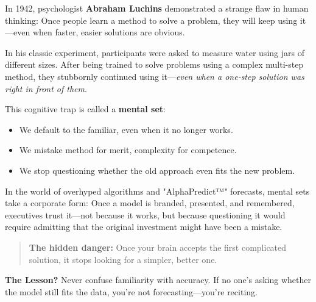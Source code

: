 \begin{tcolorbox}[colback=blue!5!white, colframe=blue!50!black,
  title={Psychological Sidebar: Mental Sets — When Your Brain Forgets to Ask if There's a Better Way}]

In 1942, psychologist \textbf{Abraham Luchins} demonstrated a strange flaw in human thinking:  
Once people learn a method to solve a problem, they will keep using it—even when faster, easier solutions are obvious.

\medskip

In his classic experiment, participants were asked to measure water using jars of different sizes.  
After being trained to solve problems using a complex multi-step method, they stubbornly continued using it—\textit{even when a one-step solution was right in front of them}.

\medskip

This cognitive trap is called a \textbf{mental set}:
\begin{itemize}
    \item We default to the familiar, even when it no longer works.
    \item We mistake method for merit, complexity for competence.
    \item We stop questioning whether the old approach even fits the new problem.
\end{itemize}

\medskip

In the world of overhyped algorithms and "AlphaPredict™" forecasts, mental sets take a corporate form:  
Once a model is branded, presented, and remembered, executives trust it—not because it works, but because questioning it would require admitting that the original investment might have been a mistake.

\medskip

\begin{quote}
\textbf{The hidden danger:} Once your brain accepts the first complicated solution, it stops looking for a simpler, better one.
\end{quote}

\medskip

\textbf{The Lesson?} Never confuse familiarity with accuracy. If no one’s asking whether the model still fits the data, you’re not forecasting—you’re reciting.
\end{tcolorbox}


